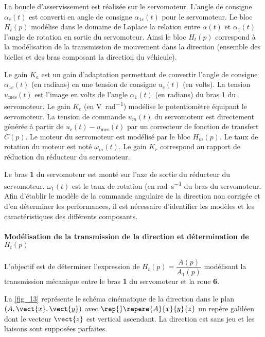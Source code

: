 La boucle d’asservissement est réalisée sur le servomoteur. L’angle de consigne $\alpha_{c}(t)$ est converti en angle de
consigne $\alpha_{1c}(t)$ pour le servomoteur. Le bloc $H_t(p)$ modélise dans le domaine de Laplace la relation entre $\alpha(t)$ et $\alpha_1(t)$ l’angle de rotation en sortie du servomoteur. Ainsi le bloc $H_t(p)$ correspond à la modélisation de la transmission de mouvement dans la direction (ensemble des bielles et des bras composant la direction du véhicule).

Le gain $K_a$ est un gain d’adaptation permettant de convertir l’angle de consigne $\alpha_{1c}(t)$ (en radians) en une tension de consigne $u_{c}(t)$ (en volts). La tension $u_{\text{mes}}(t)$ est l’image en volts de l’angle $\alpha_1(t)$ (en radians) du bras
1 du servomoteur. Le gain $K_c$ 
(en \si{V.rad^{-1}}) modélise le potentiomètre équipant le servomoteur.
La tension de commande $u_{m}(t)$ du servomoteur est directement générée à partir de $u_{c}(t) -u_{\text{mes}}(t)$ par un
correcteur de fonction de transfert $C(p)$. Le moteur du servomoteur est modélisé par le bloc $H_m(p)$. Le taux de rotation du moteur est noté $\omega_m(t)$. Le gain $K_r$ correspond au rapport de réduction du réducteur du servomoteur.

Le bras \textbf{1} du servomoteur est monté sur l’axe de sortie du réducteur du servomoteur. $\omega_1(t)$ est le taux de rotation (en \si{rad.s^{-1}} du bras du servomoteur.
Afin d’établir le modèle de la commande angulaire de la direction non corrigée et d’en déterminer les performances, il est nécessaire d’identifier les modèles et les caractéristiques des différents composants.

\paragraph{Modélisation de la transmission de la direction et détermination de $H_t(p)$}

\begin{obj}
L’objectif est de déterminer l’expression de $H_t(p)=\dfrac{A(p)}{A_1(p)}$ 
modélisant la transmission mécanique entre le bras \textbf{1} du servomoteur et la roue \textbf{6}.
\end{obj}

La \autoref{fig_13} représente le schéma cinématique de la direction dans le plan $\left(A,\vect{x},\vect{y}\right)$ avec $\rep{}\repere{A}{x}{y}{z}$ un repère
galiléen dont le vecteur $\vect{z}$ est vertical ascendant. La direction est sans jeu et les liaisons sont supposées parfaites.

